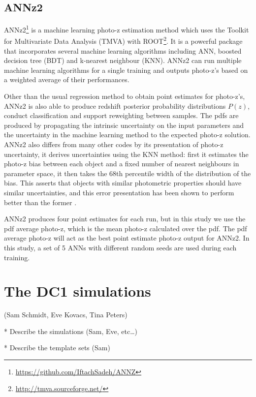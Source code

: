 \documentclass[usenatbib]{mn2e}
\begin{document}
\subsection{ANNz2}\label{sec:annz2}
ANNz2\footnote{\url{https://github.com/IftachSadeh/ANNZ}} \citep{sadeh_annz2:_2016} is a machine learning photo-z estimation method which uses the Toolkit for Multivariate Data Analysis (TMVA) with ROOT\footnote{\url{http://tmva.sourceforge.net/}}. It is a powerful package that incorporates several machine learning algorithms including ANN, boosted decision tree (BDT) and k-nearest neighbour (KNN). ANNz2 can run multiple machine learning algorithms for a single training and outputs photo-z's based on a weighted average of their performances.

Other than the usual regression method to obtain point estimates for photo-z's, ANNz2 is also able to produce redshift posterior probability distributions $P(z)$, conduct classification and support reweighting between samples. The pdfs are produced by propagating the intrinsic uncertainty on the input parameters and the uncertainty in the machine learning method to the expected photo-z solution. ANNz2 also differs from many other codes by its presentation of photo-z uncertainty, it derives uncertainties using the KNN method: first it estimates the photo-z bias between each object and a fixed number of nearest neighbours in parameter space, it then takes the 68th percentile width of the distribution of the bias. This asserts that objects with similar photometric properties should have similar uncertainties, and this error presentation has been shown to perform better than the former \citep{sadeh_annz2:_2016}.

ANNz2 produces four point estimates for each run, but in this study we use the pdf average photo-z, which is the mean photo-z calculated over the pdf. The pdf average photo-z will act as the best point estimate photo-z output for ANNz2. In this study, a set of 5 ANNs with different random seeds are used during each training. 

\section{The DC1 simulations}\label{sims}

(Sam Schmidt, Eve Kovacs, Tina Peters)

* Describe the simulations (Sam, Eve, etc…)

* Describe the template sets (Sam)
\end{document}
